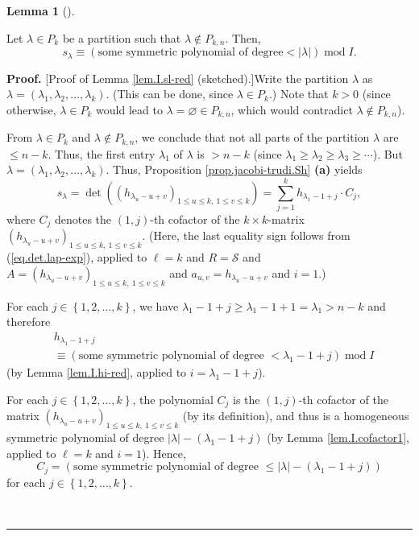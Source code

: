 \documentclass[numbers=enddot,12pt,final,onecolumn,notitlepage]{scrartcl}%
\theoremstyle{definition}
\newtheorem{lem}[theo]{Lemma}
\newenvironment{lemma}[1][]
{\begin{lem}[#1]\begin{leftbar}}
{\end{leftbar}\end{lem}}
\newenvironment{proof}[1][Proof]{\noindent\textbf{#1.} }{\ \rule{0.5em}{0.5em}}
\let\sumnonlimits\sum
\renewcommand{\sum}{\sumnonlimits\limits}
\begin{document}
\begin{lemma}
\label{lem.I.sl-red}Let $\lambda\in P_{k}$ be a partition such that
$\lambda\notin P_{k,n}$. Then,%
\[
s_{\lambda}\equiv\left(  \text{some symmetric polynomial of degree
}<\left\vert \lambda\right\vert \right)  \operatorname{mod}I.
\]

\end{lemma}

\begin{proof}
[Proof of Lemma \ref{lem.I.sl-red} (sketched).]Write the partition $\lambda$
as $\lambda=\left(  \lambda_{1},\lambda_{2},\ldots,\lambda_{k}\right)  $.
(This can be done, since $\lambda\in P_{k}$.) Note that $k>0$ (since
otherwise, $\lambda\in P_{k}$ would lead to $\lambda=\varnothing\in P_{k,n}$,
which would contradict $\lambda\notin P_{k,n}$).

From $\lambda\in P_{k}$ and $\lambda\notin P_{k,n}$, we conclude that not all
parts of the partition $\lambda$ are $\leq n-k$. Thus, the first entry
$\lambda_{1}$ of $\lambda$ is $>n-k$ (since $\lambda_{1}\geq\lambda_{2}%
\geq\lambda_{3}\geq\cdots$). But $\lambda=\left(  \lambda_{1},\lambda
_{2},\ldots,\lambda_{k}\right)  $. Thus, Proposition
\ref{prop.jacobi-trudi.Sh} \textbf{(a)} yields%
\begin{equation}
s_{\lambda}=\det\left(  \left(  h_{\lambda_{u}-u+v}\right)  _{1\leq u\leq
k,\ 1\leq v\leq k}\right)  =\sum_{j=1}^{k}h_{\lambda_{1}-1+j}\cdot C_{j},
\label{pf.lem.I.sl-red.JT}%
\end{equation}
where $C_{j}$ denotes the $\left(  1,j\right)  $-th cofactor of the $k\times
k$-matrix $\left(  h_{\lambda_{u}-u+v}\right)  _{1\leq u\leq k,\ 1\leq v\leq
k}$. (Here, the last equality sign follows from (\ref{eq.det.lap-exp}),
applied to $\ell=k$ and $R=\mathcal{S}$ and $A=\left(  h_{\lambda_{u}%
-u+v}\right)  _{1\leq u\leq k,\ 1\leq v\leq k}$ and $a_{u,v}=h_{\lambda
_{u}-u+v}$ and $i=1$.)

For each $j\in\left\{  1,2,\ldots,k\right\}  $, we have $\lambda_{1}%
-1+j\geq\lambda_{1}-1+1=\lambda_{1}>n-k$ and therefore%
\begin{align}
&  h_{\lambda_{1}-1+j}\nonumber\\
&  \equiv\left(  \text{some symmetric polynomial of degree }<\lambda
_{1}-1+j\right)  \operatorname{mod}I \label{pf.lem.I.sl-red.deg1}%
\end{align}
(by Lemma \ref{lem.I.hi-red}, applied to $i=\lambda_{1}-1+j$).

For each $j\in\left\{  1,2,\ldots,k\right\}  $, the polynomial $C_{j}$ is the
$\left(  1,j\right)  $-th cofactor of the matrix $\left(  h_{\lambda_{u}%
-u+v}\right)  _{1\leq u\leq k,\ 1\leq v\leq k}$ (by its definition), and thus
is a homogeneous symmetric polynomial of degree $\left\vert \lambda\right\vert
-\left(  \lambda_{1}-1+j\right)  $ (by Lemma \ref{lem.I.cofactor1}, applied to
$\ell=k$ and $i=1$). Hence,%
\begin{equation}
C_{j}=\left(  \text{some symmetric polynomial of degree }\leq\left\vert
\lambda\right\vert -\left(  \lambda_{1}-1+j\right)  \right)
\label{pf.lem.I.sl-red.deg}%
\end{equation}
for each $j\in\left\{  1,2,\ldots,k\right\}  $.


\end{proof}
\end{document}
